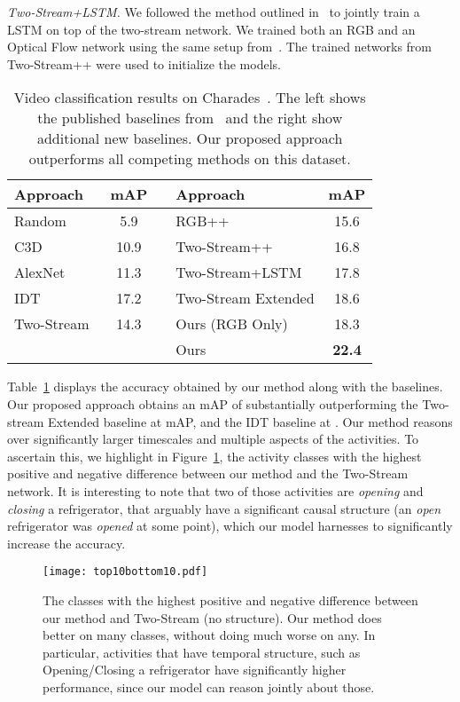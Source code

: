 \documentclass[10pt,twocolumn,letterpaper]{article}
\begin{document}
{\em Two-Stream+LSTM.} We followed the method outlined in~\cite{cnnlstm} to jointly train a LSTM on top of the two-stream network. We trained both an RGB and an Optical Flow network using the same setup from~\cite{charades}. The trained networks from Two-Stream++ were used to initialize the models.

\begin{table}[tb]
\begin{center}
{\footnotesize
\begin{tabular}{lcclc} \toprule
Approach & mAP & \hspace{2em} &Approach & mAP \\ \hline \rule{0pt}{3ex}Random~\cite{charades} & 5.9 & & RGB++ & 15.6 \\
C3D~\cite{Tran15} & 10.9 & &Two-Stream++ & 16.8\\
AlexNet~\cite{alexnet12} & 11.3 & &Two-Stream+LSTM & 17.8 \\
IDT~\cite{WangIDT13} & 17.2 & &Two-Stream Extended & 18.6\\ 
Two-Stream~\cite{Simonyan13} & 14.3 & & Ours (RGB Only) & 18.3 \\
 & & & Ours & {\bf 22.4}  \\
\bottomrule
\end{tabular}
}
\end{center}
\caption{Video classification results on Charades~\cite{charades}. The left shows the published baselines from~\cite{charades} and the right show additional new baselines. Our proposed approach outperforms all competing methods on this dataset.}
\label{tbl:classification}
\end{table}

Table~\ref{tbl:classification} displays the accuracy obtained by our method along with the baselines. Our proposed approach obtains an mAP of  substantially outperforming the Two-stream Extended baseline at  mAP, and the IDT baseline at . Our method reasons over significantly larger timescales and multiple aspects of the activities. To ascertain this, we highlight in Figure~\ref{fig:top10bottom10}, the activity classes with the highest positive and negative difference between our method and the Two-Stream network.
It is interesting to note that two of those activities are {\em opening} and {\em closing} a refrigerator, that arguably have a significant causal structure (an {\em open} refrigerator was {\em opened} at some point), which our model harnesses to significantly increase the accuracy.


\begin{figure}[t]
\centering
\texttt{[image: top10bottom10.pdf]}
\caption{The classes with the highest positive and negative difference between our method and Two-Stream (no structure). Our method does better on many classes, without doing much worse on any. In particular, activities that have temporal structure, such as Opening/Closing a refrigerator have significantly higher performance, since our model can reason jointly about those.}
\label{fig:top10bottom10}
\end{figure}
\end{document}
